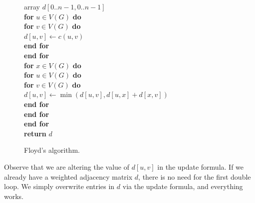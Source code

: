 \begin{figure}
\hspace*{.8in}\begin{minipage}{5in}
{
\> array $d[0..n-1,0..n-1]$ \\
\> \textbf{for} $u \in V(G)$ \textbf{do} \\
\> \> \textbf{for} $v \in V(G)$ \textbf{do} \\
\> \> \> $d[u, v] \gets c(u, v)$\\
\> \> \textbf{end for} \\
\> \textbf{end for} \\
\> \textbf{for} $x \in V(G)$ \textbf{do}\\
\> \> \textbf{for} $u \in V(G)$ \textbf{do}\\
\> \> \> \textbf{for} $v \in V(G)$ \textbf{do}\\
\> \> \> \> $d[u,v] \gets \min( d[u,v], d[u,x] + d[x,v] )$ \\
\> \> \> \textbf{end for} \\
\> \> \textbf{end for} \\
\> \textbf{end for} \\
\> \textbf{return} $d$ \\
}
\end{minipage}
\caption{Floyd's algorithm.} \label{fig:floydcode}
\end{figure}

\begin{note}
Observe that we are altering the value of $d[u, v]$ in the update
formula. If we already have a weighted adjacency matrix $d$, there is
no need for the first double loop. We simply overwrite entries in $d$
via the update formula, and everything works.
\end{note}

